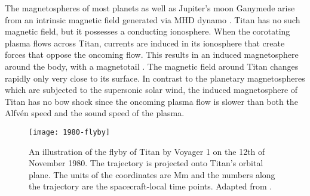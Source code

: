 \documentclass[12pt, parskip=full*, abstract]{scrartcl}
\begin{document}
The magnetospheres of most planets as well as Jupiter's moon Ganymede arise from an intrinsic magnetic field generated via MHD dynamo \parencite{encyclopedia-magnetospheres}. Titan has no such magnetic field, but it possesses a conducting ionosphere. When the corotating plasma flows across Titan, currents are induced in its ionosphere that create forces that oppose the oncoming flow. This results in an induced magnetosphere around the body, with a magnetotail . The magnetic field around Titan changes rapidly only very close to its surface. In contrast to the planetary magnetospheres which are subjected to the supersonic solar wind, the induced magnetosphere of Titan has no bow shock since the oncoming plasma flow is slower than both the Alfvén speed and the sound speed of the plasma. 



\begin{figure}[htbp]
	\centering
	\texttt{[image: 1980-flyby]}
	\caption{An illustration of the flyby of Titan by Voyager 1 on the 12th of November 1980. The trajectory is projected onto Titan's orbital plane. The units of the coordinates are \si{\mega\metre} and the numbers along the trajectory are the spacecraft-local time points. Adapted from \textcite{hartle-1982}.}
	\label{fig:1980-flyby}
\end{figure}
\end{document}
